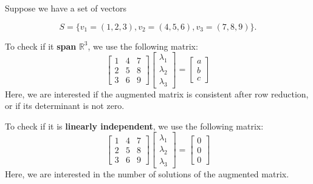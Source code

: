 \documentclass[oneside]{book}
\begin{document}

Suppose we have a set of vectors

\[
    S = \{v_1 = (1, 2, 3), v_2 = (4, 5, 6), v_3 = (7, 8, 9)\}.
\]

To check if it \textbf{span} $\mathbb{R}^3$, we use the following matrix:
\[
    \begin{bmatrix}
        1 & 4 & 7\\
        2 & 5 & 8\\
        3 & 6 & 9
    \end{bmatrix}
    \begin{bmatrix}
        \lambda_1\\ \lambda_2\\ \lambda_3
    \end{bmatrix}
    =
    \begin{bmatrix}
        a\\b\\c
    \end{bmatrix}
\]
Here, we are interested if the augmented matrix is consistent after row reduction, or if its determinant is not zero.

To check if it is \textbf{linearly independent}, we use the following matrix:
\[
    \begin{bmatrix}
        1 & 4 & 7\\
        2 & 5 & 8\\
        3 & 6 & 9
    \end{bmatrix}
    \begin{bmatrix}
        \lambda_1\\ \lambda_2\\ \lambda_3
    \end{bmatrix}
    =
    \begin{bmatrix}
        0\\0\\0
    \end{bmatrix}
\]
Here, we are interested in the number of solutions of the augmented matrix.

\end{document}
